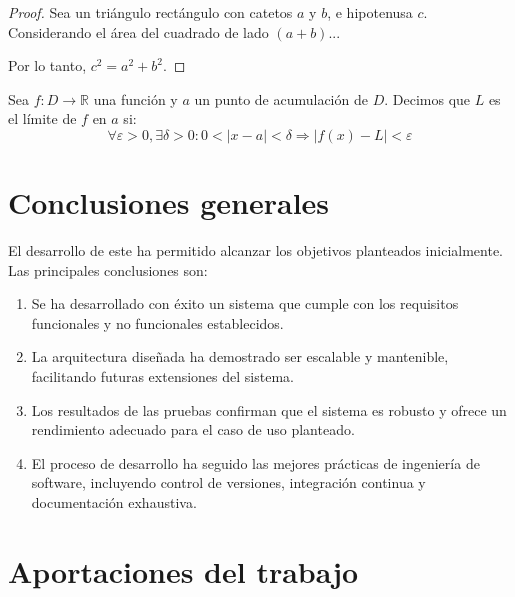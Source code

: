 \begin{proof}
  Sea un triángulo rectángulo con catetos $a$ y $b$, e hipotenusa $c$. Considerando el área del cuadrado de lado $(a+b)$...

  Por lo tanto, $c^2 = a^2 + b^2$. \qedhere
\end{proof}

\begin{definition}[Límite]
  Sea $f: D \to \mathbb{R}$ una función y $a$ un punto de acumulación de $D$. Decimos que $L$ es el límite de $f$ en $a$ si:
  \begin{equation}
    \forall \varepsilon > 0, \exists \delta > 0 : 0 < |x-a| < \delta \Rightarrow |f(x) - L| < \varepsilon
    \label{eq:limite-def}
  \end{equation}
\end{definition}

\section{Conclusiones generales}
\label{sec:conclusiones-generales}

El desarrollo de este \EPStipoTrabajo{} ha permitido alcanzar los objetivos planteados inicialmente. Las principales conclusiones son:

\begin{enumerate}
  \item Se ha desarrollado con éxito un sistema que cumple con los requisitos funcionales y no funcionales establecidos.

  \item La arquitectura diseñada ha demostrado ser escalable y mantenible, facilitando futuras extensiones del sistema.

  \item Los resultados de las pruebas confirman que el sistema es robusto y ofrece un rendimiento adecuado para el caso de uso planteado.

  \item El proceso de desarrollo ha seguido las mejores prácticas de ingeniería de software, incluyendo control de versiones, integración continua y documentación exhaustiva.
\end{enumerate}

\section{Aportaciones del trabajo}
\label{sec:aportaciones-trabajo}

